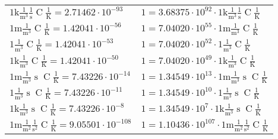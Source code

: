 \begin{center}
\begin{longtable}{l l}
{\color{gray}$1 \bm{\mathrm{ k}}\frac1{\operatorname{m}^3}\frac1{\operatorname{s}}{\operatorname{C}}\frac1{\operatorname{K}} = 2.71462\cdot10^{-93} $}   & {\color{gray}$ 1 = 3.68375\cdot10^{92} \cdot 1 \bm{\mathrm{ k}}\frac1{\operatorname{m}^3}\frac1{\operatorname{s}}{\operatorname{C}}\frac1{\operatorname{K}}$}  \\
{\color{gray}$1 \bm{\mathrm{ m}}\frac1{\operatorname{m}^3}{}{\operatorname{C}}\frac1{\operatorname{K}} = 1.42041\cdot10^{-56} $}   & {\color{gray}$ 1 = 7.04020\cdot10^{55} \cdot 1 \bm{\mathrm{ m}}\frac1{\operatorname{m}^3}{}{\operatorname{C}}\frac1{\operatorname{K}}$}  \\
{\color{black}$1 \bm{\mathrm{ }}\frac1{\operatorname{m}^3}{}{\operatorname{C}}\frac1{\operatorname{K}} = 1.42041\cdot10^{-53} $}   & {\color{black}$ 1 = 7.04020\cdot10^{52} \cdot 1 \bm{\mathrm{ }}\frac1{\operatorname{m}^3}{}{\operatorname{C}}\frac1{\operatorname{K}}$}  \\
{\color{gray}$1 \bm{\mathrm{ k}}\frac1{\operatorname{m}^3}{}{\operatorname{C}}\frac1{\operatorname{K}} = 1.42041\cdot10^{-50} $}   & {\color{gray}$ 1 = 7.04020\cdot10^{49} \cdot 1 \bm{\mathrm{ k}}\frac1{\operatorname{m}^3}{}{\operatorname{C}}\frac1{\operatorname{K}}$}  \\
{\color{gray}$1 \bm{\mathrm{ m}}\frac1{\operatorname{m}^3}{\operatorname{s}}{\operatorname{C}}\frac1{\operatorname{K}} = 7.43226\cdot10^{-14} $}   & {\color{gray}$ 1 = 1.34549\cdot10^{13} \cdot 1 \bm{\mathrm{ m}}\frac1{\operatorname{m}^3}{\operatorname{s}}{\operatorname{C}}\frac1{\operatorname{K}}$}  \\
{\color{black}$1 \bm{\mathrm{ }}\frac1{\operatorname{m}^3}{\operatorname{s}}{\operatorname{C}}\frac1{\operatorname{K}} = 7.43226\cdot10^{-11} $}   & {\color{black}$ 1 = 1.34549\cdot10^{10} \cdot 1 \bm{\mathrm{ }}\frac1{\operatorname{m}^3}{\operatorname{s}}{\operatorname{C}}\frac1{\operatorname{K}}$}  \\
{\color{gray}$1 \bm{\mathrm{ k}}\frac1{\operatorname{m}^3}{\operatorname{s}}{\operatorname{C}}\frac1{\operatorname{K}} = 7.43226\cdot10^{-8} $}   & {\color{gray}$ 1 = 1.34549\cdot10^{7} \cdot 1 \bm{\mathrm{ k}}\frac1{\operatorname{m}^3}{\operatorname{s}}{\operatorname{C}}\frac1{\operatorname{K}}$}  \\
{\color{gray}$1 \bm{\mathrm{ m}}\frac1{\operatorname{m}^2}\frac1{\operatorname{s}^2}{\operatorname{C}}\frac1{\operatorname{K}} = 9.05501\cdot10^{-108} $}   & {\color{gray}$ 1 = 1.10436\cdot10^{107} \cdot 1 \bm{\mathrm{ m}}\frac1{\operatorname{m}^2}\frac1{\operatorname{s}^2}{\operatorname{C}}\frac1{\operatorname{K}}$}  \\

\end{longtable}
\end{center}
